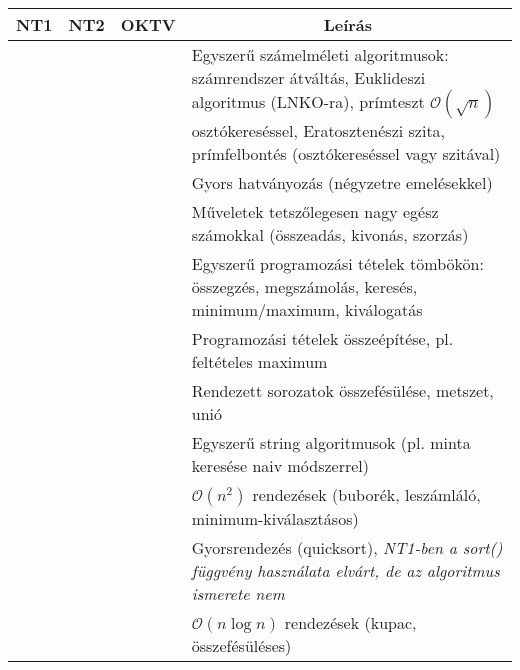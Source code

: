 \documentclass[a4paper,11pt,oneside]{article}
\newcommand{\cmark}{\ding{51}}%
\newcommand{\xmark}{\ding{55}}%
\newcommand{\CC}[1]{#1}
\newcommand{\ccode}{{\small\cmark\faFileText}}
\newcommand{\cemay}{{\small\xmark\faQuestionCircle}}
\newcommand{\cexcl}{{\small\xmark}}
\newcommand{\ctable}[1]{
    \begin{center}
        \begin{longtable}{ | C | C | C | m{8cm} | } %
        \hline
        \textbf{NT1} & \textbf{NT2} & \textbf{OKTV} & \multicolumn{1}{|c|}{\textbf{Leírás}} \\ \hline
        \endhead
        #1
        \end{longtable}
    \end{center}
}
\begin{document}
\ctable {
    \ccode & \ccode & \ccode & Egyszerű számelméleti algoritmusok: számrendszer átváltás, Euklideszi algoritmus (LNKO-ra),
    prímteszt $\mathcal{O}(\sqrt{n})$ osztókereséssel, Eratosztenészi szita, prímfelbontés (osztókereséssel vagy szitával)
    \\ \hline %
    \cexcl & \cemay & \ccode & Gyors hatványozás (négyzetre emelésekkel)
    \\ \hline %
    \cexcl & \cemay & \ccode & Műveletek tetszőlegesen nagy egész számokkal (összeadás, kivonás, szorzás)
    \\ \hline %
    \ccode & \ccode & \ccode & Egyszerű programozási tételek tömbökön: összegzés, megszámolás, keresés, minimum/maximum, kiválogatás
    \\ \hline %
    \ccode & \ccode & \ccode & Programozási tételek összeépítése, pl. feltételes maximum
    \\ \hline %
    \ccode & \ccode & \ccode & Rendezett sorozatok összefésülése, metszet, unió
    \\ \hline
    \ccode & \ccode & \ccode & Egyszerű string algoritmusok (pl. minta keresése naiv módszerrel)
    \\ \hline %
    \ccode & \ccode & \ccode & {$\mathcal{O}(n^2)$} rendezések (buborék, leszámláló, minimum-kiválasztásos)
    \\ \hline
    \cemay & \ccode & \ccode & Gyorsrendezés (quicksort), \textit{NT1-ben a sort() függvény használata elvárt, de az algoritmus ismerete nem}
    \\ \hline %
    \cexcl & \ccode & \ccode & $\mathcal{O}(n \log n)$ rendezések (kupac, összefésüléses)
    \\ \hline %
}
\end{document}
